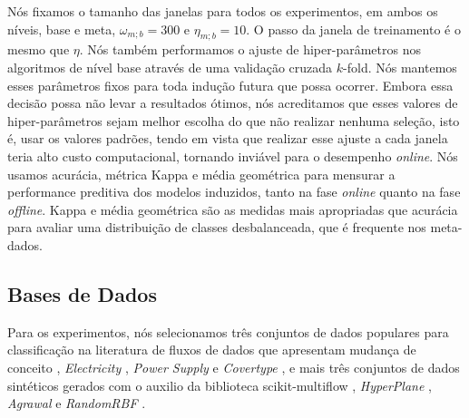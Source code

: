 Nós fixamos o tamanho das janelas para todos os experimentos, em ambos os níveis, base e meta,
$\omega_{m;b} = 300$ e $\eta_{m;b} = 10$. O passo da janela de treinamento é o mesmo que $\eta$.
Nós também performamos o ajuste de hiper-parâmetros nos algoritmos de nível base através de uma
validação cruzada $k$-fold. Nós mantemos esses parâmetros fixos para toda indução futura que possa
ocorrer. Embora essa decisão possa não levar a resultados ótimos, nós acreditamos que esses 
valores de hiper-parâmetros sejam melhor escolha do que não realizar nenhuma seleção, isto é,
usar os valores padrões, tendo em vista que realizar esse ajuste a cada janela teria alto custo computacional, tornando inviável para o desempenho \textit{online}. Nós usamos acurácia, métrica Kappa e
média geométrica para mensurar a performance preditiva dos modelos induzidos, tanto na fase \textit{online}
quanto na fase \textit{offline}. Kappa e média geométrica são as medidas mais apropriadas que acurácia
para avaliar uma distribuição de classes desbalanceada, que é frequente nos meta-dados.

\subsection{Bases de Dados}
Para os experimentos, nós selecionamos três conjuntos de dados populares para classificação na
literatura de fluxos de dados que apresentam mudança de conceito
\cite{vanrijn2014algorithm,read2012batch}, \textit{Electricity} \cite{gama2004learning},
\textit{Power Supply} \cite{zhu2010stream} e \textit{Covertype} \cite{blackard1998covertype},
e mais três conjuntos de dados sintéticos gerados com o auxilio da biblioteca scikit-multiflow
\cite{skmultiflow}, \textit{HyperPlane} \cite{hulten2001mining}, \textit{Agrawal}
\cite{agrawal1993database} e \textit{RandomRBF} \cite{skmultiflow}.


